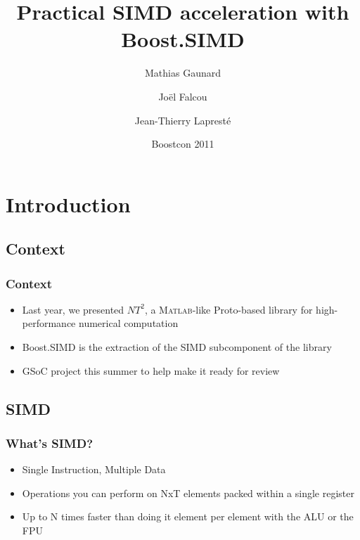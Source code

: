 \documentclass{beamer}
\title{Practical SIMD acceleration with Boost.SIMD}
\author{Mathias Gaunard \and Joël Falcou \and Jean-Thierry Lapresté}
\institute[MetaScale]{MetaScale Inc.}
\date[BOOST 2011]{Boostcon 2011}
\begin{document}


\begin{frame}
\titlepage
\end{frame}

\section{Introduction}

\subsection{Context}
\begin{frame}
	\frametitle{Context}

	\begin{itemize}
		\item Last year, we presented $NT^2$, a \textsc{Matlab}-like Proto-based library
		      for high-performance numerical computation
		\item Boost.SIMD is the extraction of the SIMD subcomponent of the
		      library
		\item GSoC project this summer to help make it ready for review
	\end{itemize}

\end{frame}

\subsection{SIMD}
\begin{frame}
	\frametitle{What's SIMD?}

	\begin{multicols}{2}

	\begin{itemize}
		\item Single Instruction, Multiple Data
		\item Operations you can perform on NxT elements
		      packed within a single register
		\item Up to N times faster than doing it element per element
		      with the ALU or the FPU
	\end{itemize}
	
	
	\end{multicols}

\end{frame}
\end{document}

